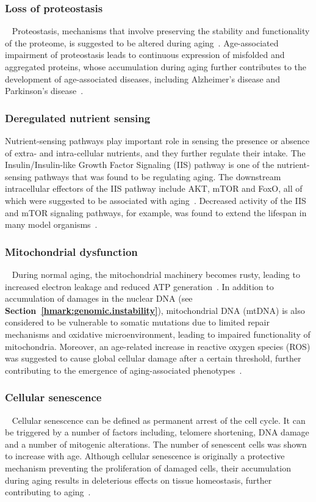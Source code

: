\subsubsection{Loss of proteostasis}~\label{hmark:proteosis}
Proteostasis, mechanisms that involve preserving the stability and functionality of the proteome, is suggested to be altered during aging~\autocite{Koga2011}. 
Age-associated impairment of proteostasis leads to continuous expression of misfolded and aggregated proteins, 
whose accumulation during aging further contributes to the development of age-associated diseases, including Alzheimer's disease and Parkinson's disease~\autocite{Powers2009}.

\subsubsection{Deregulated nutrient sensing}
Nutrient-sensing pathways play important role in sensing the presence or absence of extra- and intra-cellular nutrients, and they further regulate their intake.
The Insulin/Insulin-like Growth Factor Signaling (IIS) pathway is one of the nutrient-sensing pathways that was found to be regulating aging.
The downstream intracellular effectors of the IIS pathway include AKT, mTOR and FoxO, all of which were suggested to be associated with aging~\autocite{Fontana2010, Barzilai2012, Kenyon2010}.
Decreased activity of the IIS and mTOR signaling pathways, for example, was found to extend the lifespan in many model organisms~\autocite{Fontana2010}. 

\subsubsection{Mitochondrial dysfunction}~\label{hmark:mt.dysfunction}
During normal aging, the mitochondrial machinery becomes rusty, leading to increased electron leakage and reduced ATP generation~\autocite{Green2011}.
In addition to accumulation of damages in the nuclear DNA (see \textbf{Section~\ref{hmark:genomic.instability}}), 
mitochondrial DNA (mtDNA) is also considered to be vulnerable to somatic mutations due to limited repair mechanisms and oxidative microenvironment,
leading to impaired functionality of mitochondria.
Moreover, an age-related increase in reactive oxygen species (ROS) was suggested to cause global cellular damage after a certain threshold, 
further contributing to the emergence of aging-associated phenotypes~\autocite{Hekimi2011}.

\subsubsection{Cellular senescence}~\label{hmark:cell.senes}
Cellular senescence can be defined as permanent arrest of the cell cycle.
It can be triggered by a number of factors including, telomere shortening, DNA damage and a number of mitogenic alterations.
The number of senescent cells was shown to increase with age.
Although cellular senescence is originally a protective mechanism preventing the proliferation of damaged cells,
their accumulation during aging results in deleterious effects on tissue homeostasis, further contributing to aging~\autocite{Yousefzadeh2020, Biran2017}.

